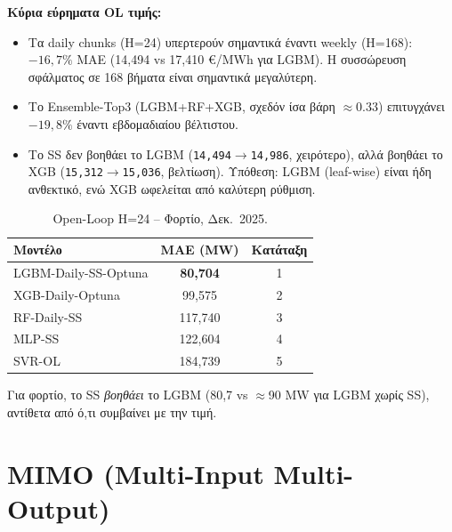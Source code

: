 \textbf{Κύρια εύρηματα OL τιμής:}
\begin{itemize}
    \item Τα daily chunks (H=24) υπερτερούν σημαντικά έναντι weekly (H=168): $-16,7\%$ MAE
    (14,494 vs 17,410 €/MWh για LGBM). Η συσσώρευση σφάλματος σε 168 βήματα είναι σημαντικά
    μεγαλύτερη.
    \item Το Ensemble-Top3 (LGBM+RF+XGB, σχεδόν ίσα βάρη $\approx 0.33$) επιτυγχάνει $-19,8\%$
    έναντι εβδομαδιαίου βέλτιστου.
    \item Το SS δεν βοηθάει το LGBM (\texttt{14,494$\to$14,986}, χειρότερο), αλλά βοηθάει το XGB
    (\texttt{15,312$\to$15,036}, βελτίωση). Υπόθεση: LGBM (leaf-wise) είναι ήδη ανθεκτικό, ενώ XGB
    ωφελείται από καλύτερη ρύθμιση.
\end{itemize}

\begin{table}[H]
\centering
\caption{Open-Loop H=24 -- Φορτίο, Δεκ.\ 2025.}
\label{tab:ol_load_1m}
\begin{tabular}{lcc}
\toprule
\textbf{Μοντέλο} & \textbf{MAE (MW)} & \textbf{Κατάταξη} \\
\midrule
LGBM-Daily-SS-Optuna & \textbf{80,704} & 1 \\
XGB-Daily-Optuna & 99,575 & 2 \\
RF-Daily-SS & 117,740 & 3 \\
MLP-SS & 122,604 & 4 \\
SVR-OL & 184,739 & 5 \\
\bottomrule
\end{tabular}
\end{table}

\noindent Για φορτίο, το SS \textit{βοηθάει} το LGBM (80,7 vs $\approx$90 MW για LGBM χωρίς SS),
αντίθετα από ό,τι συμβαίνει με την τιμή.


\section{MIMO (Multi-Input Multi-Output)}
\label{sec:mimo_results}


